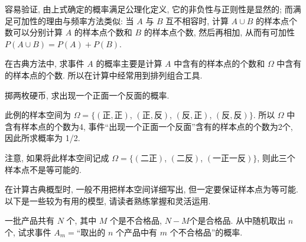 容易验证,
由上式确定的概率满足公理化定义,
它的非负性与正则性是显然的;
而满足可加性的理由与频率方法类似:
当 $A$ 与 $B$ 互不相容时,
计算 $A \cup B$ 的样本点个数可以分别计算 $A$ 的样本点个数和 $B$ 的样本点个数,
然后再相加,
从而有可加性 $P (A \cup B) = P (A) + P (B) $.

在古典方法中,
求事件 $A$ 的概率主要是计算 $A$ 中含有的样本点的个数和 $\Omega$ 中含有的样本点的个数.
所以在计算中经常用到排列组合工具.

\begin{example}
  掷两枚硬币,
  求出现一个正面一个反面的概率.
\end{example}

\begin{solution}
  此例的样本空间为 $\Omega = \{ (\text{正}, \text{正})$, $(\text{正}, \text{反})$, $(\text{反}, \text{正})$, $(\text{反}, \text{反}) \}$.
  所以 $\Omega$ 中含有样本点的个数为4,
  事件“出现一个正面一个反面”含有的样本点的个数为2个,
  因此所求概率为 1/2.
\end{solution}

注意,
如果将此样本空间记成 $\Omega = \{ (\text{二正})$, $(\text{二反})$, $(\text{一正一反}) \}$,
则此三个样本点不是等可能的.

在计算古典概型时,
一般不用把样本空间详细写出,
但一定要保证样本点为等可能.
以下是一些较为有用的模型,
请读者熟练掌握和灵活运用.

\begin{example}[抽样模型]\label{exmp1.2.3}
  一批产品共有 $N$ 个,
  其中 $M$ 个是不合格品,
  $N - M$个是合格品.
  从中随机取出 $n$ 个,
  试求事件 $A _m =$“取出的 $n$ 个产品中有 $m$ 个不合格品”的概率.
\end{example}

